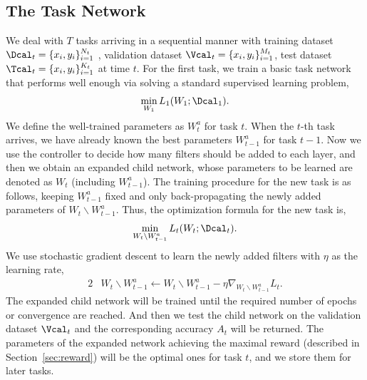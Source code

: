 \documentclass{article}
\begin{document}
\subsection{The Task Network}
We deal with  $T$ tasks arriving in a sequential manner  with training dataset $\Dcal_t=\{x_i,y_i\}_{i=1}^{N_t}$ , validation dataset $\Vcal_t=\{x_i,y_i\}_{i=1}^{M_t}$, test dataset $\Tcal_t = \{x_i,y_i\}_{i=1}^{K_t}$ at time $t$.
For the first task, we train a basic task network that performs well enough via solving a standard supervised learning problem,
\begin{alignat}{2}
\label{init}   %
\min_{W_1} L_1(W_1;\Dcal_1).
\end{alignat}
We define the well-trained parameters as $W_t^a$ for task $t$.
When the $t$-th task arrives, we have already known the best parameters $W_{t-1}^a$ for task $t-1$. Now we use the controller to decide how many filters should be added to each layer, and then we obtain an expanded child network, whose parameters to be learned are denoted as $W_t$ (including $W_{t-1}^a$). The training procedure for the new task is as follows, keeping $W_{t-1}^a$ fixed and only back-propagating the newly added parameters of $W_t \backslash W_{t-1}^a$. Thus, the optimization formula for the new task is,
\begin{alignat}{2}
\label{latter}   %
\min_{W_t \backslash W_{t-1}^a} L_t(W_t;\Dcal_t).
\end{alignat}
We use stochastic gradient descent to learn the newly added filters with $\eta$ as the learning rate,
\begin{alignat}{2}
\label{update}
& W_t \backslash W_{t-1}^a \longleftarrow W_t \backslash W_{t-1}^a - \eta \nabla_{W_t \backslash W_{t-1}^a} L_t.
\end{alignat}
The expanded child network will be trained until  the required number of epochs or convergence are reached. And then we test the child network on the validation dataset $\Vcal_t$ and the corresponding accuracy $A_t$ will be returned.
The parameters of the expanded network achieving the maximal reward (described in Section~\ref{sec:reward}) will be the optimal ones for task $t$, and we store them for later tasks.
\end{document}
